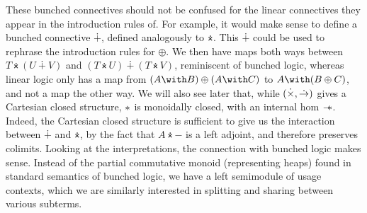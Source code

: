 These bunched connectives should not be confused for the linear connectives
they appear in the introduction rules of.
For example, it would make sense to define a bunched connective $\dotplus$,
defined analogously to $\dottimes$.
This $\dotplus$ could be used to rephrase the introduction rules for $\oplus$.
We then have maps both ways between $T \dottimes (U \dotplus V)$ and
$(T \dottimes U) \dotplus (T \dottimes V)$, reminiscent of bunched logic,
whereas linear logic only has a map from $(A \with B) \oplus (A \with C)$ to
$A \with (B \oplus C)$, and not a map the other way.
We will also see later that, while
$(\mathbin{\dot\times}, \mathrel{\dot\to})$ gives a Cartesian
closed structure, $\mathbin{*}$ is monoidally closed, with an internal hom $\mathrel{\mathord{-}\hspace{-0.75ex}*}$.
Indeed, the Cartesian closed structure is sufficient to give us the interaction
between $\dotplus$ and $\dottimes$, by the fact that $A \dottimes {-}$ is a
left adjoint, and therefore preserves colimits.
Looking at the interpretations, the connection with bunched logic makes sense.
Instead of the partial commutative monoid (representing heaps) found in
standard semantics of bunched logic, we have a left semimodule of usage
contexts, which we are similarly interested in splitting and sharing between
various subterms.

